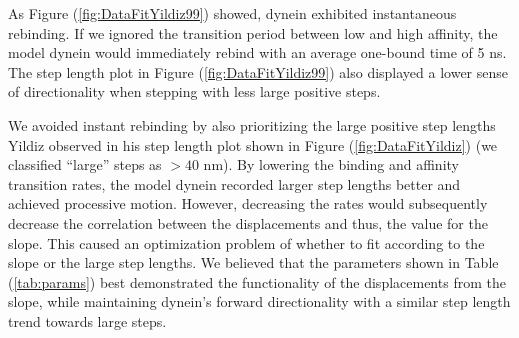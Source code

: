 As Figure (\ref{fig:DataFitYildiz99}) showed, dynein exhibited instantaneous rebinding. If we ignored the transition period between low and high affinity, the model dynein would immediately rebind with an average one-bound time of 5 ns. The step length plot in Figure (\ref{fig:DataFitYildiz99}) also displayed a lower sense of directionality when stepping with less large positive steps. 

We avoided instant rebinding by also prioritizing the large positive step lengths Yildiz observed in his step length plot shown in Figure (\ref{fig:DataFitYildiz}) (we classified ``large'' steps as $> 40$ nm). By lowering the binding and affinity transition rates,  the model dynein recorded larger step lengths better and achieved processive motion. However, decreasing the rates would subsequently decrease the correlation between the displacements and thus, the value for the slope. This caused an optimization problem of whether to fit according to the slope or the large step lengths. We believed that the parameters shown in Table (\ref{tab:params}) best demonstrated the functionality of the displacements from the slope, while maintaining dynein's forward directionality with a similar step length trend towards large steps.

%



